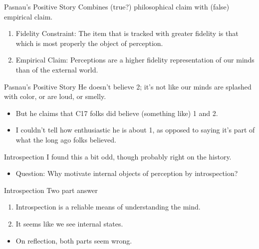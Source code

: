 \documentclass[
  17pt,
  letterpaper,
  ignorenonframetext,
  aspectratio=169,
]{beamer}
\providecommand{\tightlist}{%
  \setlength{\itemsep}{0pt}\setlength{\parskip}{0pt}}\usepackage{longtable,booktabs,array}
\begin{document}
\begin{frame}{Pasnau's Positive Story}
\protect\hypertarget{pasnaus-positive-story}{}
Combines (true?) philosophical claim with (false) empirical claim.

\begin{enumerate}[<+->]
\tightlist
\item
  Fidelity Constraint: The item that is tracked with greater fidelity is
  that which is most properly the object of perception.
\item
  Empirical Claim: Perceptions are a higher fidelity representation of
  our minds than of the external world.
\end{enumerate}
\end{frame}

\begin{frame}{Pasnau's Positive Story}
\protect\hypertarget{pasnaus-positive-story-1}{}
He doesn't believe 2; it's not like our minds are splashed with color,
or are loud, or smelly.

\begin{itemize}[<+->]
\tightlist
\item
  But he claims that C17 folks did believe (something like) 1 and 2.
\item
  I couldn't tell how enthusiastic he is about 1, as opposed to saying
  it's part of what the long ago folks believed.
\end{itemize}
\end{frame}

\begin{frame}{Introspection}
\protect\hypertarget{introspection}{}
I found this a bit odd, though probably right on the history.

\begin{itemize}[<+->]
\tightlist
\item
  Question: Why motivate internal objects of perception by
  introspection?
\end{itemize}
\end{frame}

\begin{frame}{Introspection}
\protect\hypertarget{introspection-1}{}
Two part answer

\begin{enumerate}[<+->]
\tightlist
\item
  Introspection is a reliable means of understanding the mind.
\item
  It seems like we see internal states.
\end{enumerate}

\begin{itemize}[<+->]
\tightlist
\item
  On reflection, both parts seem wrong.
\end{itemize}
\end{frame}
\end{document}
